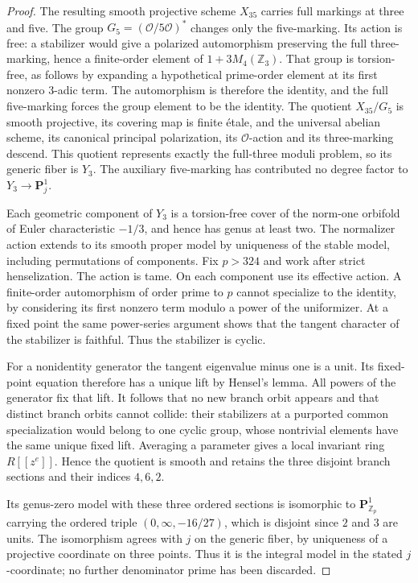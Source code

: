 \documentclass[11pt]{article}
\theoremstyle{definition}
\theoremstyle{remark}
\begin{document}
\begin{proof}
The resulting smooth projective scheme $X_{35}$ carries full
markings at three and five. The group
$G_5=(\mathcal O/5\mathcal O)^*$ changes only the five-marking.
Its action is free: a stabilizer would give a polarized automorphism
preserving the full three-marking, hence a finite-order element of
$1+3M_4(\mathbb Z_3)$. That group is torsion-free, as follows by
expanding a hypothetical prime-order element at its first nonzero
$3$-adic term. The automorphism is therefore the identity, and
the full five-marking forces the group element to be the identity.
The quotient $X_{35}/G_5$ is smooth projective, its covering map is
finite \'{e}tale, and the universal abelian scheme, its canonical
principal polarization, its $\mathcal O$-action and its three-marking
descend. This quotient represents exactly the full-three moduli
problem, so its generic fiber is $Y_3$. The auxiliary five-marking
has contributed no degree factor to $Y_3\to\mathbf P^1_j$.

Each geometric component of $Y_3$ is a torsion-free cover of the
norm-one orbifold of Euler characteristic $-1/3$, and hence has genus
at least two. The normalizer action extends to its smooth proper
model by uniqueness of the stable model, including permutations of
components. Fix $p>324$ and work after strict henselization.
The action is tame. On each component use its effective action.
A finite-order automorphism of order prime to $p$ cannot specialize
to the identity, by considering its first nonzero term modulo a
power of the uniformizer. At a fixed point the same power-series
argument shows that the tangent character of the stabilizer is
faithful. Thus the stabilizer is cyclic.

For a nonidentity generator the tangent eigenvalue minus one is a
unit. Its fixed-point equation therefore has a unique lift by
Hensel's lemma. All powers of the generator fix that lift. It follows
that no new branch orbit appears and that distinct branch orbits
cannot collide: their stabilizers at a purported common specialization
would belong to one cyclic group, whose nontrivial elements have the
same unique fixed lift. Averaging a parameter gives a local invariant
ring $R[[z^e]]$. Hence the quotient is smooth and retains the three
disjoint branch sections and their indices $4,6,2$.

Its genus-zero model with these three ordered sections is isomorphic
to $\mathbf P^1_{\mathbb Z_p}$ carrying the ordered triple
$(0,\infty,-16/27)$, which is disjoint since $2$ and $3$ are units.
The isomorphism agrees with $j$ on the generic fiber, by uniqueness
of a projective coordinate on three points. Thus it is the integral
model in the stated $j$-coordinate; no further denominator prime
has been discarded.


\end{proof}
\end{document}
